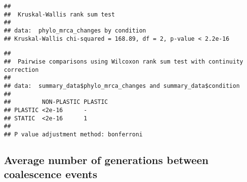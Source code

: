 \documentclass[]{book}
\newenvironment{Shaded}{\begin{snugshade}}{\end{snugshade}}
\newcommand{\DataTypeTok}[1]{\textcolor[rgb]{0.13,0.29,0.53}{#1}}
\newcommand{\KeywordTok}[1]{\textcolor[rgb]{0.13,0.29,0.53}{\textbf{#1}}}
\newcommand{\NormalTok}[1]{#1}
\newcommand{\OperatorTok}[1]{\textcolor[rgb]{0.81,0.36,0.00}{\textbf{#1}}}
\newcommand{\StringTok}[1]{\textcolor[rgb]{0.31,0.60,0.02}{#1}}
\begin{document}
\begin{verbatim}
## 
##  Kruskal-Wallis rank sum test
## 
## data:  phylo_mrca_changes by condition
## Kruskal-Wallis chi-squared = 168.89, df = 2, p-value < 2.2e-16
\end{verbatim}

\begin{Shaded}
\end{Shaded}

\begin{verbatim}
## 
##  Pairwise comparisons using Wilcoxon rank sum test with continuity correction 
## 
## data:  summary_data$phylo_mrca_changes and summary_data$condition 
## 
##         NON-PLASTIC PLASTIC
## PLASTIC <2e-16      -      
## STATIC  <2e-16      1      
## 
## P value adjustment method: bonferroni
\end{verbatim}

\hypertarget{average-number-of-generations-between-coalescence-events-1}{%
\subsection{Average number of generations between coalescence events}\label{average-number-of-generations-between-coalescence-events-1}}
\end{document}
